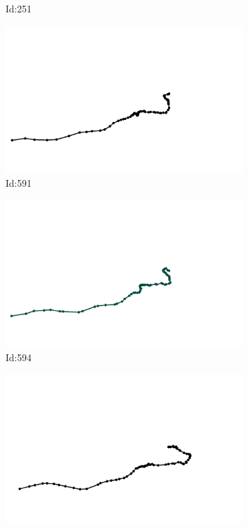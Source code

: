 \documentclass[12pt,twoside]{report}
\begin{document}
\begin{figure}
\begin{subfigure}[b]{0.20\textwidth}
\caption{Id:251}
\end{subfigure}
\begin{subfigure}[b]{0.20\textwidth}
\centering
\includegraphics[width=\textwidth]{../../trajectories/591.png}
\caption{Id:591}
\end{subfigure}
\begin{subfigure}[b]{0.20\textwidth}
\centering
\includegraphics[width=\textwidth]{../../trajectories/594.png}
\caption{Id:594}
\end{subfigure}
\begin{subfigure}[b]{0.20\textwidth}
\centering
\includegraphics[width=\textwidth]{../../trajectories/682.png}

\end{subfigure}
\end{figure}
\end{document}
